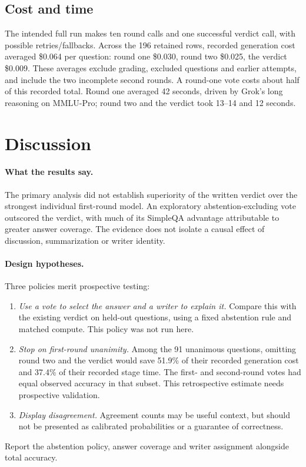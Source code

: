 \documentclass[11pt]{article}
\begin{document}
\subsection{Cost and time}
The intended full run makes ten round calls and one successful verdict call, with possible retries/fallbacks. Across the 196 retained rows, recorded generation cost averaged \$0.064 per question: round one \$0.030, round two \$0.025, the verdict \$0.009. These averages exclude grading, excluded questions and earlier attempts, and include the two incomplete second rounds. A round-one vote costs about half of this recorded total. Round one averaged 42 seconds, driven by Grok's long reasoning on MMLU-Pro; round two and the verdict took 13--14 and 12 seconds.

\section{Discussion}

\paragraph{What the results say.} The primary analysis did not establish superiority of the written verdict over the strongest individual first-round model. An exploratory abstention-excluding vote outscored the verdict, with much of its SimpleQA advantage attributable to greater answer coverage. The evidence does not isolate a causal effect of discussion, summarization or writer identity.

\paragraph{Design hypotheses.} Three policies merit prospective testing:
\begin{enumerate}
  \item \emph{Use a vote to select the answer and a writer to explain it.} Compare this with the existing verdict on held-out questions, using a fixed abstention rule and matched compute. This policy was not run here.
  \item \emph{Stop on first-round unanimity.} Among the 91 unanimous questions, omitting round two and the verdict would save 51.9\% of their recorded generation cost and 37.4\% of their recorded stage time. The first- and second-round votes had equal observed accuracy in that subset. This retrospective estimate needs prospective validation.
  \item \emph{Display disagreement.} Agreement counts may be useful context, but should not be presented as calibrated probabilities or a guarantee of correctness.
\end{enumerate}
Report the abstention policy, answer coverage and writer assignment alongside total accuracy.
\end{document}
